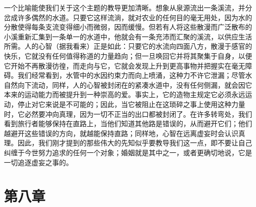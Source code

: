 一个比喻能使我们关于这个主题的教导更加清晰。想象从泉源流出一条溪流，并分岔成许多偶然的水道。只要它这样流淌，就对农业的任何目的毫无用处，因为水的分散使得每条支流变得细小而微弱，因而缓慢。但若有人将这些散漫而广泛散布的小溪重新汇集到一条单一的水道中，他就会有一条充沛而汇聚的溪流，以供应生活所需。人的心智（据我看来）正是如此：只要它的水流向四面八方，散漫于感官的快乐，它就没有任何值得称道的力量趋向；但一旦唤回它并将其聚集于自身，以便它开始不再散漫彷徨，而走向与它，它就会发现上升到更高事物并把握实在毫无障碍。我们经常看到，水管中的水因约束力而向上喷涌，这种力不许它泄漏；尽管水自然向下流动，同样，人的心智被封闭在的紧凑水道中，没有任何侧漏，就会因它本来的运动能力而被提升到一种崇高的爱。事实上，它的造物主规定它必须永远运动，停止对它来说是不可能的；因此，当它被阻止在这琐碎之事上使用这种力量时，它必然要冲向真理，因为一切不正当的出口都被封闭了。在许多转弯处，我们看到旅行者能够保持在直路上，当他们知道其他路是错误的，从而避开它们；他们越避开这些错误的方向，就越能保持直路；同样地，心智在远离虚妄时会认识真理。因此，我们刚才提到的那些伟大的先知似乎要教导我们这一点，即不要让自己纠缠于今世努力追求的任何一个对象；婚姻就是其中之一，或者更确切地说，它是一切追逐虚妄之事的。\par


\section{第八章}


